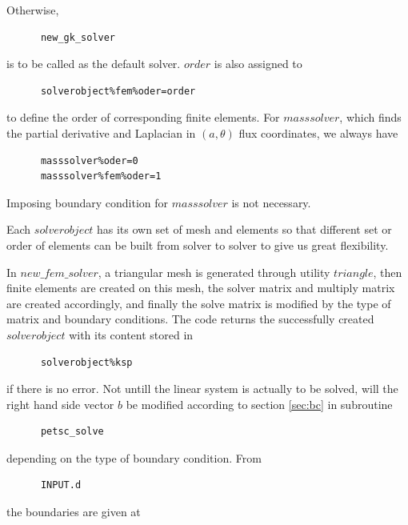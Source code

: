 \documentclass{report}
\begin{document}
\noindent
Otherwise, 

\begin{verbatim}
      new_gk_solver
\end{verbatim}

\noindent
is to be called as the default solver.  
$order$ is also assigned to 

\begin{verbatim}
      solverobject%fem%oder=order
\end{verbatim}

\noindent
to define the order of corresponding finite elements.
For $masssolver$, which finds the partial derivative and Laplacian
in $(a, \theta)$ flux coordinates, we always have

\begin{verbatim}
      masssolver%oder=0
      masssolver%fem%oder=1
\end{verbatim}

\noindent
Imposing boundary condition for $masssolver$ is not necessary.

Each $solverobject$ has its own set of mesh and elements 
so that different set or order of elements can be built from solver to solver 
to give us great flexibility.

In $new\_fem\_solver$, 
a triangular mesh is generated through utility $triangle$,
then finite elements are created on this mesh,
the solver matrix and multiply matrix are created accordingly,
and finally the solve matrix is modified by the type of matrix and boundary conditions.
The code returns the successfully created $solverobject$ 
with its content stored in

\begin{verbatim}
      solverobject%ksp
\end{verbatim}

\noindent
if there is no error.  Not untill the linear system is actually to be solved,
will the right hand side vector $b$ be modified according to section \ref{sec:bc} in subroutine

\begin{verbatim}
      petsc_solve
\end{verbatim}

\noindent
depending on the type of boundary condition.  From

\begin{verbatim}
      INPUT.d
\end{verbatim}

\noindent
the boundaries are given at
\end{document}
